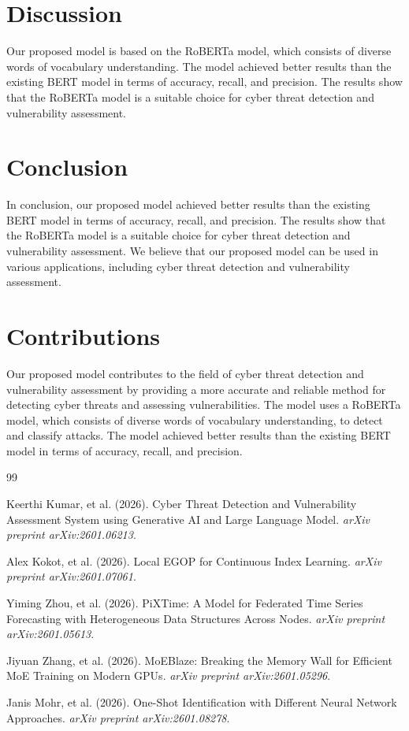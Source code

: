 \documentclass{article}
\begin{document}
\section{Discussion}

Our proposed model is based on the RoBERTa model, which consists of diverse words of vocabulary understanding. The model achieved better results than the existing BERT model in terms of accuracy, recall, and precision. The results show that the RoBERTa model is a suitable choice for cyber threat detection and vulnerability assessment.

\section{Conclusion}

In conclusion, our proposed model achieved better results than the existing BERT model in terms of accuracy, recall, and precision. The results show that the RoBERTa model is a suitable choice for cyber threat detection and vulnerability assessment. We believe that our proposed model can be used in various applications, including cyber threat detection and vulnerability assessment.

\section{Contributions}

Our proposed model contributes to the field of cyber threat detection and vulnerability assessment by providing a more accurate and reliable method for detecting cyber threats and assessing vulnerabilities. The model uses a RoBERTa model, which consists of diverse words of vocabulary understanding, to detect and classify attacks. The model achieved better results than the existing BERT model in terms of accuracy, recall, and precision.

\begin{thebibliography}{99}

Keerthi Kumar, et al. (2026). Cyber Threat Detection and Vulnerability Assessment System using Generative AI and Large Language Model. \emph{arXiv preprint arXiv:2601.06213}.

Alex Kokot, et al. (2026). Local EGOP for Continuous Index Learning. \emph{arXiv preprint arXiv:2601.07061}.

Yiming Zhou, et al. (2026). PiXTime: A Model for Federated Time Series Forecasting with Heterogeneous Data Structures Across Nodes. \emph{arXiv preprint arXiv:2601.05613}.

Jiyuan Zhang, et al. (2026). MoEBlaze: Breaking the Memory Wall for Efficient MoE Training on Modern GPUs. \emph{arXiv preprint arXiv:2601.05296}.

Janis Mohr, et al. (2026). One-Shot Identification with Different Neural Network Approaches. \emph{arXiv preprint arXiv:2601.08278}.

\end{thebibliography}
\end{document}
